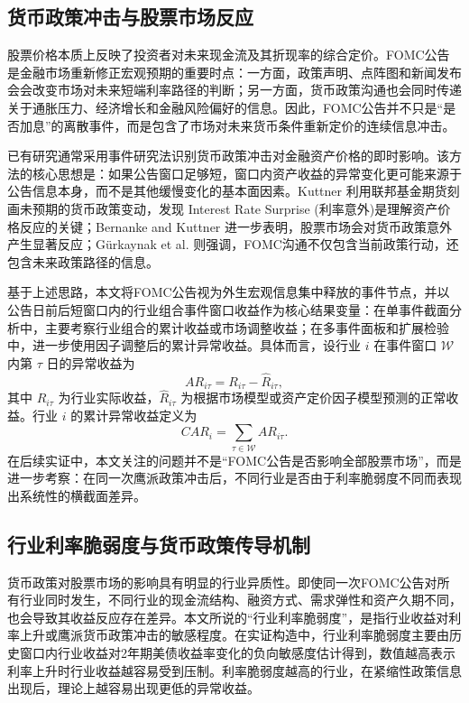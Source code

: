 \documentclass[UTF8,zihao=-4]{ctexart}
\begin{document}
\subsection{货币政策冲击与股票市场反应}

股票价格本质上反映了投资者对未来现金流及其折现率的综合定价。FOMC公告是金融市场重新修正宏观预期的重要时点：一方面，政策声明、点阵图和新闻发布会会改变市场对未来短端利率路径的判断；另一方面，货币政策沟通也会同时传递关于通胀压力、经济增长和金融风险偏好的信息。因此，FOMC公告并不只是“是否加息”的离散事件，而是包含了市场对未来货币条件重新定价的连续信息冲击。

已有研究通常采用事件研究法识别货币政策冲击对金融资产价格的即时影响。该方法的核心思想是：如果公告窗口足够短，窗口内资产收益的异常变化更可能来源于公告信息本身，而不是其他缓慢变化的基本面因素。Kuttner \citep{kuttner2001monetary} 利用联邦基金期货刻画未预期的货币政策变动，发现 Interest Rate Surprise (利率意外)是理解资产价格反应的关键；Bernanke and Kuttner \citep{bernanke2005stock} 进一步表明，股票市场会对货币政策意外产生显著反应；Gürkaynak et al. \citep{gurkaynak2005actions} 则强调，FOMC沟通不仅包含当前政策行动，还包含未来政策路径的信息。

基于上述思路，本文将FOMC公告视为外生宏观信息集中释放的事件节点，并以公告日前后短窗口内的行业组合事件窗口收益作为核心结果变量：在单事件截面分析中，主要考察行业组合的累计收益或市场调整收益；在多事件面板和扩展检验中，进一步使用因子调整后的累计异常收益。具体而言，设行业 $i$ 在事件窗口 $\mathcal{W}$ 内第 $\tau$ 日的异常收益为
\[
AR_{i\tau}=R_{i\tau}-\widehat{R}_{i\tau},
\]
其中 $R_{i\tau}$ 为行业实际收益，$\widehat{R}_{i\tau}$ 为根据市场模型或资产定价因子模型预测的正常收益。行业 $i$ 的累计异常收益定义为
\[
CAR_i=\sum_{\tau\in \mathcal{W}} AR_{i\tau}.
\]
在后续实证中，本文关注的问题并不是“FOMC公告是否影响全部股票市场”，而是进一步考察：在同一次鹰派政策冲击后，不同行业是否由于利率脆弱度不同而表现出系统性的横截面差异。

\subsection{行业利率脆弱度与货币政策传导机制}

货币政策对股票市场的影响具有明显的行业异质性。即使同一次FOMC公告对所有行业同时发生，不同行业的现金流结构、融资方式、需求弹性和资产久期不同，也会导致其收益反应存在差异。本文所说的“行业利率脆弱度”，是指行业收益对利率上升或鹰派货币政策冲击的敏感程度。在实证构造中，行业利率脆弱度主要由历史窗口内行业收益对2年期美债收益率变化的负向敏感度估计得到，数值越高表示利率上升时行业收益越容易受到压制。利率脆弱度越高的行业，在紧缩性政策信息出现后，理论上越容易出现更低的异常收益。
\end{document}
